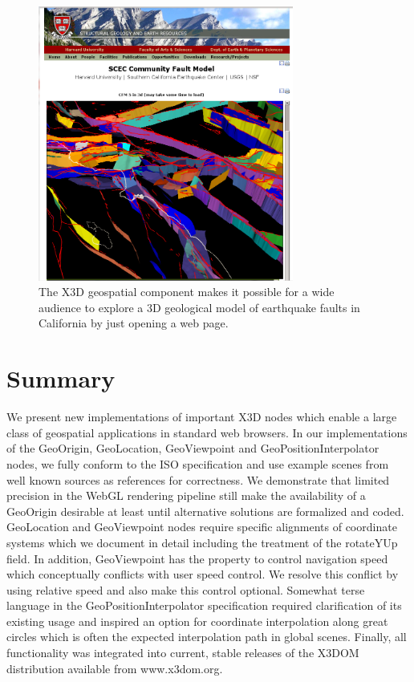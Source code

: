 \documentclass{acmsiggraph}                     %
\begin{document}
\begin{figure}[htbp] \centering \includegraphics[width=3.3in]{Application_SCEC.png} \caption{The X3D
  geospatial component makes it possible for a wide audience to explore a 3D geological model of
earthquake faults in California by just opening a web page.} \label{fig:Application_SCEC.png}
\end{figure}



\section{Summary}

We present new implementations of important X3D nodes which enable a large class of geospatial
applications in standard web browsers. In our implementations of the GeoOrigin, GeoLocation,
GeoViewpoint and GeoPositionInterpolator nodes, we fully conform to the ISO specification and use
example scenes from well known sources as references for correctness. We demonstrate that limited
precision in the WebGL rendering pipeline still make the availability of a GeoOrigin desirable at
least until alternative solutions are formalized and coded. GeoLocation and GeoViewpoint nodes
require specific alignments of coordinate systems which we document in detail including the
treatment of the rotateYUp field. In addition, GeoViewpoint has the property to control navigation
speed which conceptually conflicts with user speed control. We resolve this conflict by using
relative speed and also make this control optional. Somewhat terse language in the
GeoPositionInterpolator specification required clarification of its existing usage and inspired an
option for coordinate interpolation along great circles which is often the expected interpolation
path in global scenes. Finally, all functionality was integrated into current, stable releases of
the X3DOM distribution available from www.x3dom.org.







 \nocite{*} 
\end{document}

